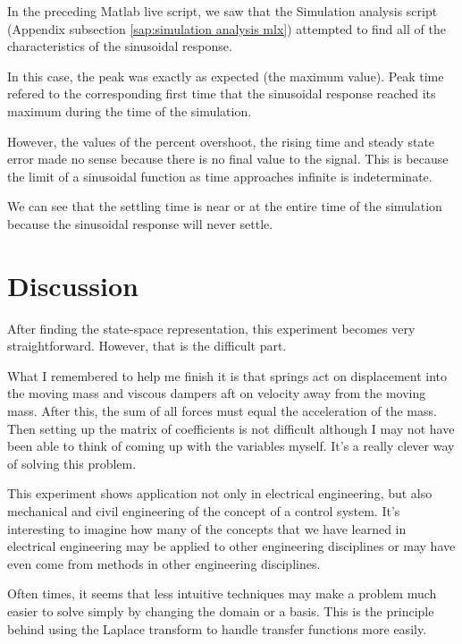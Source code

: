 \documentclass[12pt]{article}
\begin{document}


In the preceding Matlab live script,
we saw that
the Simulation analysis script (Appendix subsection \ref{sap:simulation analysis mlx})
attempted to find all of the characteristics of the sinusoidal response.

In this case, the peak was exactly as expected (the maximum value).
Peak time refered to the corresponding first time that the sinusoidal response reached its maximum
during the time of the simulation.

However, the values of the percent overshoot, the rising time and steady state error made no sense because there is no final value to the signal.
This is because the limit of a sinusoidal function as time approaches infinite is indeterminate.

We can see that the settling time is near or at the entire time of the simulation because the sinusoidal response will never settle.

\section{Discussion}

After finding the state-space representation,
this experiment becomes very straightforward.
However, that is the difficult part.

What I remembered to help me finish it is that springs act on displacement into the moving mass and viscous dampers aft on velocity away from the moving mass.
After this, the sum of all forces must equal the acceleration of the mass.
Then setting up the matrix of coefficients is not difficult although I may not have been able to think of coming up with the variables myself.
It's a really clever way of solving this problem.

This experiment shows application not only in electrical engineering, but also mechanical and civil engineering of the concept of a control system.
It's interesting to imagine how many of the concepts that we have learned in electrical engineering may be applied to other engineering disciplines or may have even come from methods in other engineering disciplines.

Often times, it seems that less intuitive techniques may make a problem much easier to solve simply by changing the domain or a basis.
This is the principle behind using the Laplace transform to handle transfer functions more easily.

\newpage
\appendix
\end{document}
